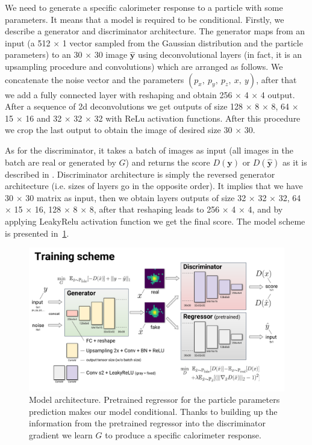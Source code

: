 \documentclass{webofc}
\newcommand{\vx}{\mathbf{x}}
\begin{document}
We need to generate a specific calorimeter response to a particle with some parameters. It means that a model is required to be conditional.
Firstly, we describe a generator and discriminator architecture. The generator maps from an input (a 512 $\times$ 1 vector sampled from the Gaussian distribution and the particle parameters) to an 30 $\times$ 30 image $\hat{\textbf{y}}$ using deconvolutional layers (in fact, it is an upsampling procedure and convolutions) which are arranged as follows. We concatenate the noise vector and the parameters $(p_x,~ p_y,~ p_z,~ x,~ y)$, after that we add a fully connected layer with reshaping and obtain 256 $\times$ 4 $\times$ 4 output. After a sequence of 2d deconvolutions we get outputs of size  128 $\times$ 8 $\times$ 8, 64 $\times$ 15 $\times$ 16 and 32 $\times$ 32 $\times$ 32  with ReLu activation functions. After this procedure we crop the last output to obtain the image of desired size 30 $\times$ 30.

As for the discriminator, it takes a batch of images as input (all images in the batch are real or generated by $G$) and returns the score $D(\textbf{y})$ or $D(\hat{\textbf{y}})$ as it is described in \cite{arjovsky2017wasserstein}. Discriminator architecture is simply the reversed generator architecture (i.e. sizes of layers go in the opposite order). It implies that we have 30 $\times$ 30 matrix as input, then we obtain layers outputs of size 32 $\times$ 32 $\times$ 32, 64 $\times$ 15 $\times$ 16, 128 $\times$ 8 $\times$  8, after that reshaping leads to 256 $\times$ 4 $\times$ 4, and by applying LeakyRelu activation function we get the final score. The model scheme is presented in~\cref{fig:model}.

\begin{figure}
\centering
\includegraphics[width=1\textwidth]{figures/model_architecture.pdf}
\caption{Model architecture. Pretrained regressor for the particle parameters prediction makes our model conditional. Thanks to building up the information from the pretrained regressor into the discriminator gradient we learn $G$ to produce a specific calorimeter response.}\label{fig:model}
\end{figure}
\end{document}
